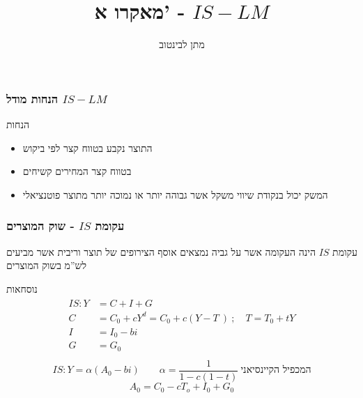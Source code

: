 \documentclass[usenames,dvipsnames]{beamer}
\title[{}]{{מאקרו א' - $IS-LM$}}
\author{\texthebrew{ מתן לבינטוב}}
\institute[{ אב"ג}]{{ אוניברסיטת בן גוריון בנגב}}
\date{}
\begin{document}
	\begin{RTL}
		\begin{frame}
			\titlepage
		\end{frame}

        \begin{frame}
            \frametitle{ הנחות מודל  $ IS-LM $  }
            \begin{block}{הנחות}
                \begin{itemize}
                    \item התוצר נקבע בטווח קצר לפי ביקוש
                    \item בטווח קצר המחירים קשיחים
                    \item המשק יכול בנקודת שיווי משקל אשר גבוהה יותר או נמוכה יותר מתוצר פוטנציאלי
                \end{itemize}
            \end{block}
        \end{frame}


        \begin{frame}
            \frametitle{עקומת $IS$ - שוק המוצרים}
            עקומת $IS$ הינה העקומה אשר על גביה נמצאים אוסף הצירופים של תוצר וריבית אשר מביעים לש''מ בשוק המוצרים
            \begin{block}{נוסחאות}
                \begin{align*}
                    \begin{split}
                        IS : Y &= C + I + G \\
                        C & = C_0 + cY^d = C_0  + c\left( Y-T \ \right) \   ; \quad T = T_0 + tY \\
                        I & =   I_0 - bi \\ 
                        G &= G_0 \\ 
                    \end{split}
                \end{align*}
                \begin{equation*}
                    IS : Y = \alpha \left( A_0 - bi \right) \qquad \alpha = \frac{1}{1-c(1-t)} \: \text{המכפיל הקיינסיאני}
                \end{equation*}
                \begin{equation*}
                    A_0 = C_0 - cT_o + I_0 + G_0
                \end{equation*}
            \end{block}



\end{frame}
\end{RTL}
\end{document}
